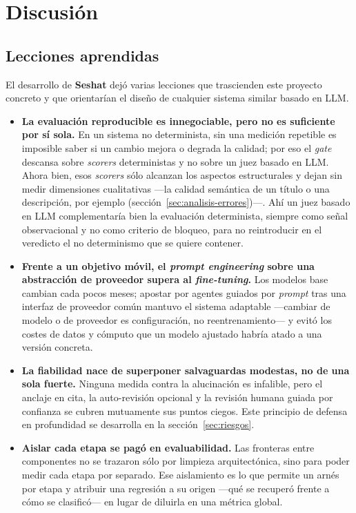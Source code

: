 \chapter{Discusión}
\label{ch:discusion}

\section{Lecciones aprendidas}

El desarrollo de \textbf{Seshat} dejó varias lecciones que trascienden este proyecto concreto y
que orientarían el diseño de cualquier sistema similar basado en \ac{LLM}.

\begin{itemize}
  \item \textbf{La evaluación reproducible es innegociable, pero no es suficiente por sí sola.}
        En un sistema no determinista, sin una medición repetible es imposible saber si un cambio
        mejora o degrada la calidad; por eso el \textit{gate} descansa sobre \textit{scorers}
        deterministas y no sobre un juez basado en \ac{LLM}. Ahora bien, esos \textit{scorers} sólo
        alcanzan los aspectos estructurales y dejan sin medir dimensiones cualitativas —la calidad
        semántica de un título o una descripción, por ejemplo (sección~\ref{sec:analisis-errores})—.
        Ahí un juez basado en \ac{LLM} complementaría bien la evaluación determinista, siempre como
        señal observacional y no como criterio de bloqueo, para no reintroducir en el veredicto el
        no determinismo que se quiere contener.

  \item \textbf{Frente a un objetivo móvil, el \textit{prompt engineering} sobre una abstracción de
        proveedor supera al \textit{fine-tuning}.} Los modelos base cambian cada pocos meses;
        apostar por agentes guiados por \textit{prompt} tras una interfaz de proveedor común
        mantuvo el sistema adaptable —cambiar de modelo o de proveedor es configuración, no
        reentrenamiento— y evitó los costes de datos y cómputo que un modelo ajustado habría atado
        a una versión concreta.

  \item \textbf{La fiabilidad nace de superponer salvaguardas modestas, no de una sola fuerte.}
        Ninguna medida contra la alucinación es infalible, pero el anclaje en cita, la auto-revisión
        opcional y la revisión humana guiada por confianza se cubren mutuamente sus puntos ciegos.
        Este principio de defensa en profundidad se desarrolla en la
        sección~\ref{sec:riesgos}.

  \item \textbf{Aislar cada etapa se pagó en evaluabilidad.} Las fronteras entre componentes no se
        trazaron sólo por limpieza arquitectónica, sino para poder medir cada etapa por separado.
        Ese aislamiento es lo que permite un arnés por etapa y atribuir una regresión a su origen
        —qué se recuperó frente a cómo se clasificó— en lugar de diluirla en una métrica global.
\end{itemize}

